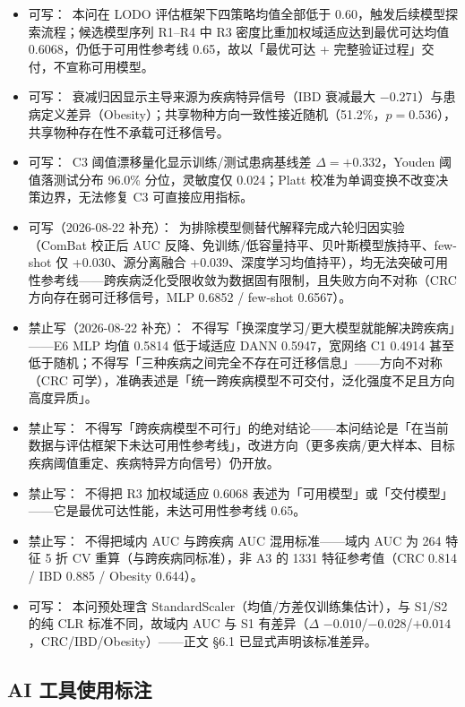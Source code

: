 \documentclass{article}   %
\begin{document}
\begin{itemize}
  \item 可写：\ 本问在 LODO 评估框架下四策略均值全部低于 0.60，触发后续模型探索流程；候选模型序列 R1--R4 中 R3 密度比重加权域适应达到最优可达均值 0.6068，仍低于可用性参考线 0.65，故以「最优可达 + 完整验证过程」交付，不宣称可用模型。
  \item 可写：\ 衰减归因显示主导来源为疾病特异信号（IBD 衰减最大 $-0.271$）与患病定义差异（Obesity）；共享物种方向一致性接近随机（51.2\%，$p=0.536$），共享物种存在性不承载可迁移信号。
  \item 可写：\ C3 阈值漂移量化显示训练/测试患病基线差 $\Delta=+0.332$，Youden 阈值落测试分布 96.0\% 分位，灵敏度仅 0.024；Platt 校准为单调变换不改变决策边界，无法修复 C3 可直接应用指标。
  \item 可写（2026-08-22 补充）：\ 为排除模型侧替代解释完成六轮归因实验（ComBat 校正后 AUC 反降、免训练/低容量持平、贝叶斯模型族持平、few-shot 仅 +0.030、源分离融合 +0.039、深度学习均值持平），均无法突破可用性参考线——跨疾病泛化受限收敛为数据固有限制，且失败方向不对称（CRC 方向存在弱可迁移信号，MLP 0.6852 / few-shot 0.6567）。
  \item 禁止写（2026-08-22 补充）：\ 不得写「换深度学习/更大模型就能解决跨疾病」——E6 MLP 均值 0.5814 低于域适应 DANN 0.5947，宽网络 C1 0.4914 甚至低于随机；不得写「三种疾病之间完全不存在可迁移信息」——方向不对称（CRC 可学），准确表述是「统一跨疾病模型不可交付，泛化强度不足且方向高度异质」。
  \item 禁止写：\ 不得写「跨疾病模型不可行」的绝对结论——本问结论是「在当前数据与评估框架下未达可用性参考线」，改进方向（更多疾病/更大样本、目标疾病阈值重定、疾病特异方向信号）仍开放。
  \item 禁止写：\ 不得把 R3 加权域适应 0.6068 表述为「可用模型」或「交付模型」——它是最优可达性能，未达可用性参考线 0.65。
  \item 禁止写：\ 不得把域内 AUC 与跨疾病 AUC 混用标准——域内 AUC 为 264 特征 5 折 CV 重算（与跨疾病同标准），非 A3 的 1331 特征参考值（CRC 0.814 / IBD 0.885 / Obesity 0.644）。
  \item 可写：\ 本问预处理含 StandardScaler（均值/方差仅训练集估计），与 S1/S2 的纯 CLR 标准不同，故域内 AUC 与 S1 有差异（$\Delta$ $-0.010$/$-0.028$/$+0.014$，CRC/IBD/Obesity）——正文 §6.1 已显式声明该标准差异。
\end{itemize}

\subsection{AI 工具使用标注}
\end{document}
